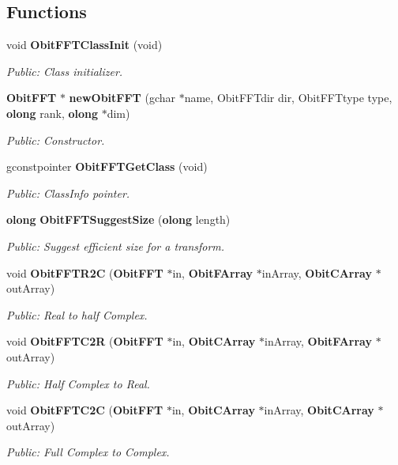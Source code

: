\subsection*{Functions}
\begin{CompactItemize}
\item 
void {\bf Obit\-FFTClass\-Init} (void)
\begin{CompactList}\small\item\em Public: Class initializer. \item\end{CompactList}\item 
{\bf Obit\-FFT} $\ast$ {\bf new\-Obit\-FFT} (gchar $\ast$name, Obit\-FFTdir dir, Obit\-FFTtype type, {\bf olong} rank, {\bf olong} $\ast$dim)
\begin{CompactList}\small\item\em Public: Constructor. \item\end{CompactList}\item 
gconstpointer {\bf Obit\-FFTGet\-Class} (void)
\begin{CompactList}\small\item\em Public: Class\-Info pointer. \item\end{CompactList}\item 
{\bf olong} {\bf Obit\-FFTSuggest\-Size} ({\bf olong} length)
\begin{CompactList}\small\item\em Public: Suggest efficient size for a transform. \item\end{CompactList}\item 
void {\bf Obit\-FFTR2C} ({\bf Obit\-FFT} $\ast$in, {\bf Obit\-FArray} $\ast$in\-Array, {\bf Obit\-CArray} $\ast$out\-Array)
\begin{CompactList}\small\item\em Public: Real to half Complex. \item\end{CompactList}\item 
void {\bf Obit\-FFTC2R} ({\bf Obit\-FFT} $\ast$in, {\bf Obit\-CArray} $\ast$in\-Array, {\bf Obit\-FArray} $\ast$out\-Array)
\begin{CompactList}\small\item\em Public: Half Complex to Real. \item\end{CompactList}\item 
void {\bf Obit\-FFTC2C} ({\bf Obit\-FFT} $\ast$in, {\bf Obit\-CArray} $\ast$in\-Array, {\bf Obit\-CArray} $\ast$out\-Array)
\begin{CompactList}\small\item\em Public: Full Complex to Complex. \item\end{CompactList}\end{CompactItemize}


